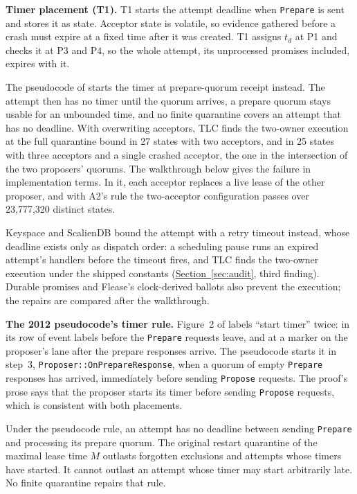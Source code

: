 \documentclass[final,5p,times,twocolumn,number]{elsarticle}
\newcommand{\code}[1]{\texttt{#1}}
\newcommand{\secref}[1]{\hyperref[#1]{Section~\ref*{#1}}}
\begin{document}
\noindent\textbf{Timer placement (T1).}  T1 starts the attempt deadline when \code{Prepare} is sent and stores it as state.  Acceptor state is volatile, so evidence gathered before a crash must expire at a fixed time after it was created.  T1 assigns $t_d$ at P1 and checks it at P3 and P4, so the whole attempt, its unprocessed promises included, expires with it.

The pseudocode of \cite{ref1} starts the timer at prepare-quorum receipt instead.  The attempt then has no timer until the quorum arrives, a prepare quorum stays usable for an unbounded time, and no finite quarantine covers an attempt that has no deadline.  With overwriting acceptors, TLC finds the two-owner execution at the full quarantine bound in 27 states with two acceptors, and in 25 states with three acceptors and a single crashed acceptor, the one in the intersection of the two proposers' quorums.  The walkthrough below gives the failure in implementation terms.  In it, each acceptor replaces a live lease of the other proposer, and with A2's rule the two-acceptor configuration passes over 23{,}777{,}320 distinct states.

Keyspace and ScalienDB bound the attempt with a retry timeout instead, whose deadline exists only as dispatch order: a scheduling pause runs an expired attempt's handlers before the timeout fires, and TLC finds the two-owner execution under the shipped constants (\secref{sec:audit}, third finding).  Durable promises and Flease's clock-derived ballots \cite{ref10} also prevent the execution; the repairs are compared after the walkthrough.

\smallskip
\noindent\textbf{The 2012 pseudocode's timer rule.}  Figure~2 of \cite{ref1} labels ``start timer'' twice: in its row of event labels before the \code{Prepare} requests leave, and at a marker on the proposer's lane after the prepare responses arrive.  The pseudocode starts it in step~3, \code{Proposer::OnPrepareResponse}, when a quorum of empty \code{Prepare} responses has arrived, immediately before sending \code{Propose} requests.  The proof's prose says that the proposer starts its timer before sending \code{Propose} requests, which is consistent with both placements.

Under the pseudocode rule, an attempt has no deadline between sending \code{Prepare} and processing its prepare quorum.  The original restart quarantine of the maximal lease time $M$ outlasts forgotten exclusions and attempts whose timers have started.  It cannot outlast an attempt whose timer may start arbitrarily late.  No finite quarantine repairs that rule.
\end{document}
